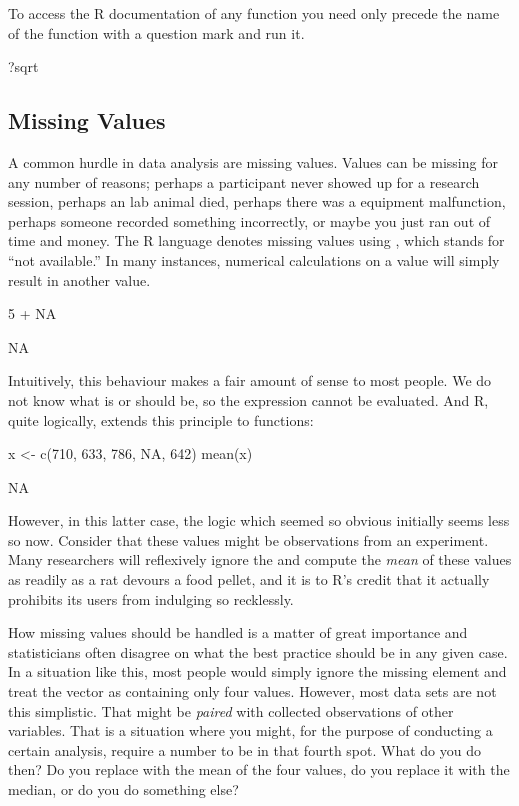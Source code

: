 To access the R documentation of any function you need only precede the name of the function with a question mark and run it.

\begin{inR}
?sqrt
\end{inR}


\subsection{Missing Values}

A common hurdle in data analysis are missing values.  Values can be missing for any number of reasons; perhaps a participant never showed up for a research session, perhaps an lab animal died, perhaps there was a equipment malfunction, perhaps someone recorded something incorrectly, or maybe you just ran out of time and money. The R language denotes missing values using , which stands for ``not available.'' In many instances, numerical calculations on a  value will simply result in another  value.

\begin{inR}
5 + NA
\end{inR}
\begin{outR}
[1] NA
\end{outR}

Intuitively, this behaviour makes a fair amount of sense to most people.  We do not know what  is or should be, so the expression  cannot be evaluated. And R, quite logically, extends this principle to functions:

\begin{inR}
x <- c(710, 633, 786, NA, 642)
mean(x)
\end{inR}
\begin{outR}
[1] NA
\end{outR}

However, in this latter case, the logic which seemed so obvious initially seems less so now.  Consider that these values might be observations from an experiment.  Many researchers will reflexively ignore the  and compute the \textit{mean} of these values as readily as a rat devours a food pellet, and it is to R's credit that it actually prohibits its users from indulging so recklessly.

How missing values should be handled is a matter of great importance and statisticians often disagree on what the best practice should be in any given case. In a situation like this, most people would simply ignore the missing element and treat the vector as containing only four values. However, most data sets are not this simplistic.  That  might be \textit{paired} with collected observations of other variables. That is a situation where you might, for the purpose of conducting a certain analysis, require a number to be in that fourth spot. What do you do then? Do you replace  with the mean of the four values, do you replace it with the median, or do you do something else?

